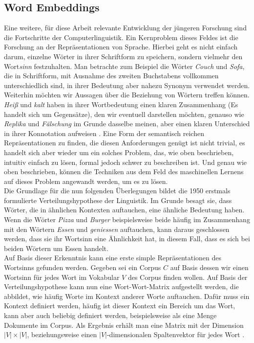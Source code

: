 \subsection{Word Embeddings}
Eine weitere, für diese Arbeit relevante Entwicklung der jüngeren Forschung sind die Fortschritte der Computerlinguistik. Ein Kernproblem dieses Feldes ist die Forschung an der Repräsentationen von Sprache. Hierbei geht es nicht einfach darum, einzelne Wörter in ihrer Schriftform zu speichern, sondern vielmehr den Wort\emph{sinn} festzuhalten. Man betrachte zum Beispiel die Wörter \emph{Couch} und \emph{Sofa}, die in Schriftform, mit Ausnahme des zweiten Buchstabens vollkommen unterschiedlich sind, in ihrer Bedeutung aber nahezu Synonym verwendet werden. Weiterhin möchten wir Aussagen über die Beziehung von Wörtern treffen können. \emph{Heiß} und \emph{kalt} haben in ihrer Wortbedeutung einen klaren Zusammenhang (Es handelt sich um Gegensätze), den wir eventuell darstellen möchten, genauso wie \emph{Replika} und \emph{Fälschung} im Grunde dasselbe meinen, aber einen klaren Unterschied in ihrer Konnotation aufweisen \parencite[Vgl.][S. 106ff.]{jurafsky_martin_2020}. 
Eine Form der semantisch reichen Repräsentationen zu finden, die diesen Anforderungen genügt ist nicht trivial, es handelt sich aber wieder um ein solches Problem, das, wie oben beschrieben, intuitiv einfach zu lösen, formal jedoch schwer zu beschreiben ist. Und genau wie oben beschrieben, können die Techniken aus dem Feld des maschinellen Lernens auf dieses Problem angewandt werden, um es zu lösen. \\

Die Grundlage für die nun folgenden Überlegungen bildet die 1950 erstmals formulierte Verteilungshypothese der Linguistik. Im Grunde besagt sie, dass Wörter, die in ähnlichen Kontexten auftauchen, eine ähnliche Bedeutung haben. Wenn die Wörter \emph{Pizza} und \emph{Burger} beispielsweise beide häufig im Zusammenhang mit den Wörtern \emph{Essen} und \emph{geniessen} auftauchen, kann daraus geschlossen werden, dass sie ihr Wortsinn eine Ähnlichkeit hat, in diesem Fall, dass es sich bei beiden Wörtern um Essen handelt. \parencite[Vgl.][S. 109]{jurafsky_martin_2020}\\

Auf Basis dieser Erkenntnis kann eine erste simple Repräsentationen des Wortsinns gefunden werden. Gegeben sei ein Corpus $C$ auf Basis dessen wir einen Wortsinn für jedes Wort im Vokabular $V$ des Corpus finden wollen. Auf Basis der Verteilungshypothese kann nun eine Wort-Wort-Matrix aufgestellt werden, die abbildet, wie häufig Worte im Kontext anderer Worte auftauchen. Dafür muss ein Kontext definiert werden, häufig ist dieser Kontext ein Bereich um das Wort, kann aber auch beliebig definiert werden, beispielsweise als eine Menge Dokumente im Corpus. Als Ergebnis erhält man eine Matrix mit der Dimension $ | V | \times | V | $, beziehungsweise einen $|V|$-dimensionalen Spaltenvektor für jedes Wort \parencite[Vgl. ][S. 113]{jurafsky_martin_2020}.\\

